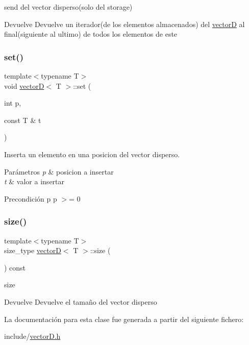 send del vector disperso(solo del storage) 

\begin{DoxyReturn}{Devuelve}
Devuelve un iterador(de los elementos almacenados) del \hyperlink{classvectorD}{vectorD} al final(siguiente al ultimo) de todos los elementos de este 
\end{DoxyReturn}
\mbox{\label{classvectorD_a2afa5743fc4549bfb12d90a4f34a1646}} 
\subsubsection{\texorpdfstring{set()}{set()}}
{\footnotesize\ttfamily template$<$typename T$>$ \\
void \hyperlink{classvectorD}{vectorD}$<$ T $>$\+::set (\begin{DoxyParamCaption}\item[{int}]{p,  }\item[{const T \&}]{t }\end{DoxyParamCaption})}



Inserta un elemento en una posicion del vector disperso. 


\begin{DoxyParams}{Parámetros}
{\em p} & posicion a insertar \\
\hline
{\em t} & valor a insertar \\
\hline
\end{DoxyParams}
\begin{DoxyPrecond}{Precondición}
p p $>$= 0 
\end{DoxyPrecond}
\mbox{\label{classvectorD_a224cbb0559f23d4eff2010b3406177f6}} 
\subsubsection{\texorpdfstring{size()}{size()}}
{\footnotesize\ttfamily template$<$typename T$>$ \\
size\+\_\+type \hyperlink{classvectorD}{vectorD}$<$ T $>$\+::size (\begin{DoxyParamCaption}{ }\end{DoxyParamCaption}) const}



size 

\begin{DoxyReturn}{Devuelve}
Devuelve el tamaño del vector disperso 
\end{DoxyReturn}


La documentación para esta clase fue generada a partir del siguiente fichero\+:\begin{DoxyCompactItemize}
\item 
include/\hyperlink{vectorD_8h}{vector\+D.\+h}\end{DoxyCompactItemize}
